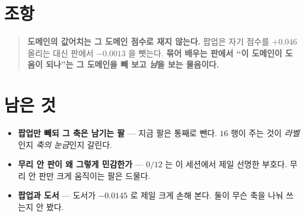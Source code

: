 \documentclass[11pt]{article}
\begin{document}
\section*{조항}

\begin{quote}
\textbf{도메인의 값어치는 그 도메인 점수로 재지 않는다.} 팝업은 자기
점수를 $+0.046$ 올리는 대신 판에서 $-0.0013$ 을 뺏는다. \textbf{묶어
배우는 판에서 ``이 도메인이 도움이 되나''는 그 도메인을 빼 보고 \emph{남}을
보는 물음이다.}
\end{quote}

\section*{남은 것}

\begin{itemize}
\item \textbf{팝업만 빼되 그 축은 남기는 팔} --- 지금 팔은 통째로 뺀다.
$16$ 행이 주는 것이 \emph{라벨}인지 \emph{축의 눈금}인지 갈린다.
\item \textbf{무리 안 판이 왜 그렇게 민감한가} --- $0/12$ 는 이 세션에서
제일 선명한 부호다. 무리 안 판만 크게 움직이는 팔은 드물다.
\item \textbf{팝업과 도서} --- 도서가 $-0.0145$ 로 제일 크게 손해 본다.
둘이 무슨 축을 나눠 쓰는지 안 봤다.
\end{itemize}
\end{document}
